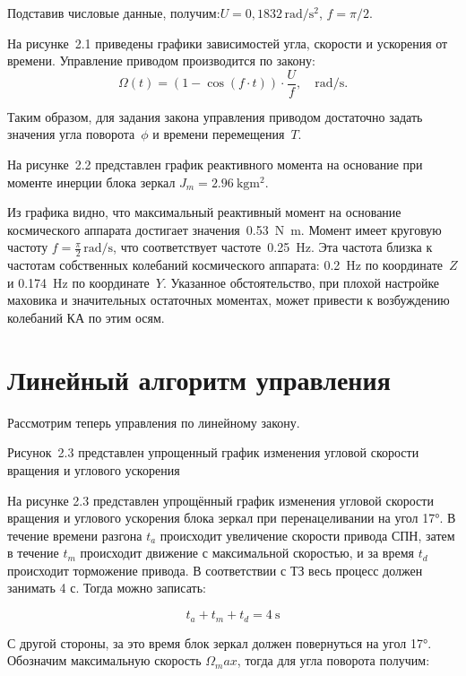 Подставив числовые данные, получим:$U = 0{,}1832\,\si{\radian/ \second^2}$, $f = \pi/2$.

На рисунке~2.1 приведены графики зависимостей угла, скорости и ускорения от времени. Управление приводом производится по закону:
\[
\Omega(t) = \left( 1 - \cos \left(f \cdot t \right)\right) \cdot \frac{U}{f}, \quad \si{\radian\per\second}.
\]

Таким образом, для задания закона управления приводом достаточно задать значения угла поворота~$\phi$ и времени перемещения~$T$.

На рисунке~2.2 представлен график реактивного момента на основание при моменте инерции блока зеркал $J_m = \SI{2.96}{\kilogram\metre\squared}$.

Из графика видно, что максимальный реактивный момент на основание космического аппарата достигает значения~\SI{0.53}{\newton\metre}. Момент имеет круговую частоту $f = \frac{\pi}{2}\, \si{\radian/\second}$, что соответствует частоте~\SI{0.25}{\hertz}. Эта частота близка к частотам собственных колебаний космического аппарата: \SI{0.2}{\hertz} по координате~$Z$ и \SI{0.174}{\hertz} по координате~$Y$. Указанное обстоятельство, при плохой настройке маховика и значительных остаточных моментах, может привести к возбуждению колебаний КА по этим осям.

\section{Линейный алгоритм управления}\label{sec:ch2/sec2}

Рассмотрим теперь управления по линейному закону.

Рисунок~2.3 представлен упрощенный график изменения угловой скорости вращения и углового ускорения

На рисунке 2.3 представлен упрощённый график изменения угловой скорости вращения и углового ускорения блока зеркал при перенацеливании на угол 17°. В течение времени разгона $t_a$ происходит увеличение скорости привода СПН, затем в течение $t_m$ происходит  движение с максимальной скоростью, и за время $t_d$ происходит торможение привода. В соответствии с ТЗ весь процесс должен занимать 4 с. Тогда можно записать:

\begin{equation}
	\label{eq:eqCh2_t_move}
	t_a+t_m+t_d=\SI{4}{\second}
\end{equation}

С другой стороны, за это время блок зеркал должен повернуться на угол 17°. Обозначим максимальную скорость $\Omega_max$, тогда для угла поворота получим:

